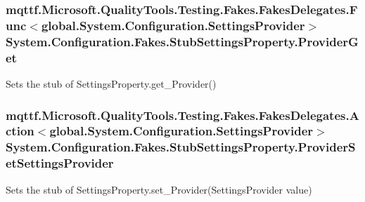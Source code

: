 \hypertarget{class_system_1_1_configuration_1_1_fakes_1_1_stub_settings_property_a7e2001ac68cd27b3615f9cf698f6b425}{
\subsubsection[{Provider\-Get}]{\setlength{\rightskip}{0pt plus 5cm}mqttf.\-Microsoft.\-Quality\-Tools.\-Testing.\-Fakes.\-Fakes\-Delegates.\-Func$<$global.\-System.\-Configuration.\-Settings\-Provider$>$ System.\-Configuration.\-Fakes.\-Stub\-Settings\-Property.\-Provider\-Get}}\label{class_system_1_1_configuration_1_1_fakes_1_1_stub_settings_property_a7e2001ac68cd27b3615f9cf698f6b425}


Sets the stub of Settings\-Property.\-get\-\_\-\-Provider()

\hypertarget{class_system_1_1_configuration_1_1_fakes_1_1_stub_settings_property_ac8315cf10c996663a2fd7860bb36f6dc}{
\subsubsection[{Provider\-Set\-Settings\-Provider}]{\setlength{\rightskip}{0pt plus 5cm}mqttf.\-Microsoft.\-Quality\-Tools.\-Testing.\-Fakes.\-Fakes\-Delegates.\-Action$<$global.\-System.\-Configuration.\-Settings\-Provider$>$ System.\-Configuration.\-Fakes.\-Stub\-Settings\-Property.\-Provider\-Set\-Settings\-Provider}}\label{class_system_1_1_configuration_1_1_fakes_1_1_stub_settings_property_ac8315cf10c996663a2fd7860bb36f6dc}


Sets the stub of Settings\-Property.\-set\-\_\-\-Provider(\-Settings\-Provider value)

